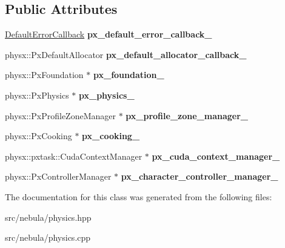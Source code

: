 \subsection*{Public Attributes}
\begin{DoxyCompactItemize}
\item 
\hypertarget{classneb_1_1physics_a819d98df4d7357116516e0f2df0e34fc}{
\hyperlink{classDefaultErrorCallback}{DefaultErrorCallback} {\bfseries px\_\-default\_\-error\_\-callback\_\-}}
\label{classneb_1_1physics_a819d98df4d7357116516e0f2df0e34fc}

\item 
\hypertarget{classneb_1_1physics_a63bea60198e1c6460c104fdd38ab2018}{
physx::PxDefaultAllocator {\bfseries px\_\-default\_\-allocator\_\-callback\_\-}}
\label{classneb_1_1physics_a63bea60198e1c6460c104fdd38ab2018}

\item 
\hypertarget{classneb_1_1physics_ab6ad04fa0dd429d2e43808dbe4ff6874}{
physx::PxFoundation $\ast$ {\bfseries px\_\-foundation\_\-}}
\label{classneb_1_1physics_ab6ad04fa0dd429d2e43808dbe4ff6874}

\item 
\hypertarget{classneb_1_1physics_afc65796d459735ca9e946582934f57ad}{
physx::PxPhysics $\ast$ {\bfseries px\_\-physics\_\-}}
\label{classneb_1_1physics_afc65796d459735ca9e946582934f57ad}

\item 
\hypertarget{classneb_1_1physics_a727d7d7cb92e32a99d3b3463993f989f}{
physx::PxProfileZoneManager $\ast$ {\bfseries px\_\-profile\_\-zone\_\-manager\_\-}}
\label{classneb_1_1physics_a727d7d7cb92e32a99d3b3463993f989f}

\item 
\hypertarget{classneb_1_1physics_ab12401759700525d86a7219d6c649e7b}{
physx::PxCooking $\ast$ {\bfseries px\_\-cooking\_\-}}
\label{classneb_1_1physics_ab12401759700525d86a7219d6c649e7b}

\item 
\hypertarget{classneb_1_1physics_aa7129bf5f326d56721c401780fab8613}{
physx::pxtask::CudaContextManager $\ast$ {\bfseries px\_\-cuda\_\-context\_\-manager\_\-}}
\label{classneb_1_1physics_aa7129bf5f326d56721c401780fab8613}

\item 
\hypertarget{classneb_1_1physics_ab736a4b3ffe77be9ef6be2ea128fcaf8}{
physx::PxControllerManager $\ast$ {\bfseries px\_\-character\_\-controller\_\-manager\_\-}}
\label{classneb_1_1physics_ab736a4b3ffe77be9ef6be2ea128fcaf8}

\end{DoxyCompactItemize}


The documentation for this class was generated from the following files:\begin{DoxyCompactItemize}
\item 
src/nebula/physics.hpp\item 
src/nebula/physics.cpp\end{DoxyCompactItemize}
